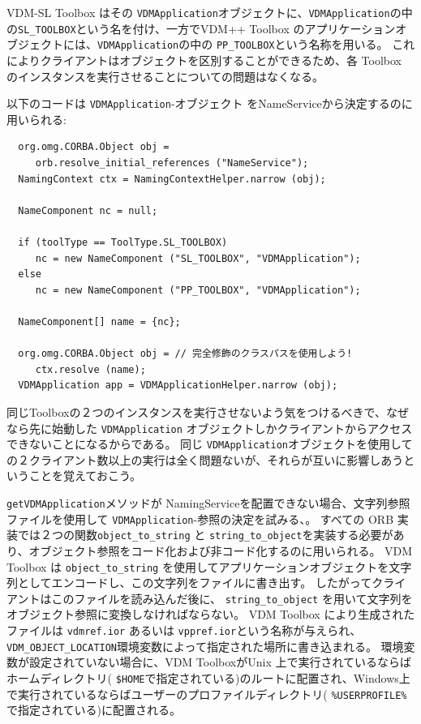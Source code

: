 \documentclass[\pformat,12pt]{jarticle}
\begin{document}
VDM-SL Toolbox はその {\tt VDMApplication}オブジェクトに、{\tt VDMApplication}の中の{\tt SL\_TOOLBOX}という名を付け、一方でVDM++ Toolbox のアプリケーションオブジェクトには、{\tt VDMApplication}の中の {\tt PP\_TOOLBOX}という名称を用いる。
これによりクライアントはオブジェクトを区別することができるため、各 Toolbox のインスタンスを実行させることについての問題はなくなる。

以下のコードは {\tt VDMApplication}-オブジェクト をNameServiceから決定するのに用いられる:

\begin{verbatim}
  org.omg.CORBA.Object obj = 
     orb.resolve_initial_references ("NameService");
  NamingContext ctx = NamingContextHelper.narrow (obj);

  NameComponent nc = null;

  if (toolType == ToolType.SL_TOOLBOX)
     nc = new NameComponent ("SL_TOOLBOX", "VDMApplication");
  else
     nc = new NameComponent ("PP_TOOLBOX", "VDMApplication");

  NameComponent[] name = {nc};
  
  org.omg.CORBA.Object obj = // 完全修飾のクラスパスを使用しよう!
     ctx.resolve (name);
  VDMApplication app = VDMApplicationHelper.narrow (obj);
\end{verbatim}

同じToolboxの２つのインスタンスを実行させないよう気をつけるべきで、なぜなら先に始動した {\tt VDMApplication} オブジェクトしかクライアントからアクセスできないことになるからである。
同じ {\tt VDMApplication}オブジェクトを使用しての２クライアント数以上の実行は全く問題ないが、それらが互いに影響しあうということを覚えておこう。

 {\tt getVDMApplication}メソッドが NamingServiceを配置できない場合、文字列参照ファイルを使用して  {\tt VDMApplication}-参照の決定を試みる、。
すべての ORB 実装では２つの関数{\tt  object\_to\_string} と {\tt string\_to\_object}を実装する必要があり、オブジェクト参照をコード化および非コード化するのに用いられる。
 VDM Toolbox は {\tt  object\_to\_string} を使用してアプリケーションオブジェクトを文字列としてエンコードし、この文字列をファイルに書き出す。
したがってクライアントはこのファイルを読み込んだ後に、 {\tt string\_to\_object} を用いて文字列をオブジェクト参照に変換しなければならない。
 VDM Toolbox により生成されたファイルは {\tt  vdmref.ior} あるいは {\tt vppref.ior}という名称が与えられ、{\tt VDM\_OBJECT\_LOCATION}環境変数によって指定された場所に書き込まれる。
環境変数が設定されていない場合に、VDM ToolboxがUnix 上で実行されているならばホームディレクトリ( {\tt  \$HOME}で指定されている)のルートに配置され、Windows上で実行されているならばユーザーのプロファイルディレクトリ( {\tt \%USERPROFILE\%}で指定されている)に配置される。
\end{document}
